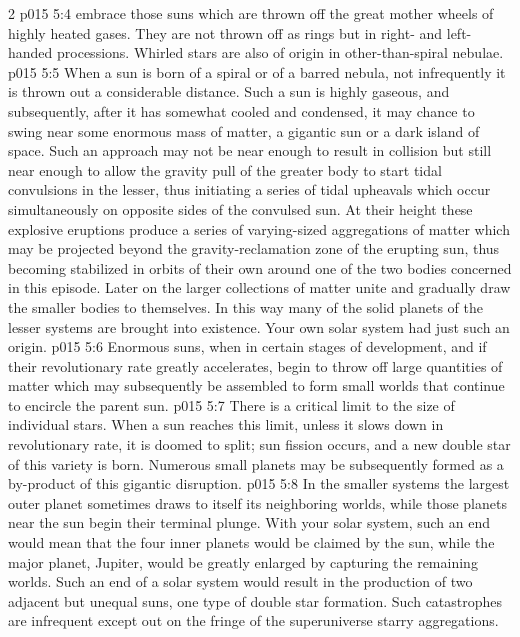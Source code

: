 \begin{multicols}{2}
\pc \vs p015 5:4 \bibnobreakspace {} embrace those suns which are thrown off the great mother wheels of highly heated gases. They are not thrown off as rings but in right\hyp{} and left\hyp{}handed processions. Whirled stars are also of origin in other\hyp{}than\hyp{}spiral nebulae.
\pc \vs p015 5:5 \bibnobreakspace {} When a sun is born of a spiral or of a barred nebula, not infrequently it is thrown out a considerable distance. Such a sun is highly gaseous, and subsequently, after it has somewhat cooled and condensed, it may chance to swing near some enormous mass of matter, a gigantic sun or a dark island of space. Such an approach may not be near enough to result in collision but still near enough to allow the gravity pull of the greater body to start tidal convulsions in the lesser, thus initiating a series of tidal upheavals which occur simultaneously on opposite sides of the convulsed sun. At their height these explosive eruptions produce a series of varying\hyp{}sized aggregations of matter which may be projected beyond the gravity\hyp{}reclamation zone of the erupting sun, thus becoming stabilized in orbits of their own around one of the two bodies concerned in this episode. Later on the larger collections of matter unite and gradually draw the smaller bodies to themselves. In this way many of the solid planets of the lesser systems are brought into existence. Your own solar system had just such an origin.
\pc \vs p015 5:6 \bibnobreakspace {} Enormous suns, when in certain stages of development, and if their revolutionary rate greatly accelerates, begin to throw off large quantities of matter which may subsequently be assembled to form small worlds that continue to encircle the parent sun.
\pc \vs p015 5:7 \bibnobreakspace {} There is a critical limit to the size of individual stars. When a sun reaches this limit, unless it slows down in revolutionary rate, it is doomed to split; sun fission occurs, and a new double star of this variety is born. Numerous small planets may be subsequently formed as a by\hyp{}product of this gigantic disruption.
\pc \vs p015 5:8 \bibnobreakspace {} In the smaller systems the largest outer planet sometimes draws to itself its neighboring worlds, while those planets near the sun begin their terminal plunge. With your solar system, such an end would mean that the four inner planets would be claimed by the sun, while the major planet, Jupiter, would be greatly enlarged by capturing the remaining worlds. Such an end of a solar system would result in the production of two adjacent but unequal suns, one type of double star formation. Such catastrophes are infrequent except out on the fringe of the superuniverse starry aggregations.

\end{multicols}
